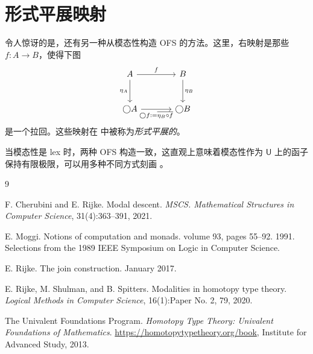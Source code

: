 \documentclass[UTF8]{ctexart}
\theoremstyle{definition}
\newcommand{\U}{\mathsf{U}}
\newcommand{\modal}{\bigcirc}
\begin{document}
\section{形式平展映射}

令人惊讶的是，还有另一种从模态性构造 OFS 的方法。这里，右映射是那些 $f : A \to B$，使得下图
\[
\begin{tikzcd}[row sep=large, column sep=large]
A \arrow[r, "f"] \arrow[d, "\eta_A"'] & B \arrow[d, "\eta_B"] \\
\modal A \arrow[r, "\modal f:=\overline{\eta_B\circ f}"'] & \modal B
\end{tikzcd}
\]
是一个拉回。这些映射在 \cite{CR21} 中被称为\emph{形式平展的}。

当模态性是 lex 时，两种 OFS 构造一致，这直观上意味着模态性作为 $\U$ 上的函子保持有限极限，可以用多种不同方式刻画 \cite[定理 3.1]{RSS20}。

\begin{thebibliography}{9}

F. Cherubini and E. Rijke.
Modal descent.
\textit{MSCS. Mathematical Structures in Computer Science}, 31(4):363--391, 2021.

E. Moggi.
Notions of computation and monads.
volume 93, pages 55--92. 1991.
Selections from the 1989 IEEE Symposium on Logic in Computer Science.

E. Rijke.
The join construction.
January 2017.

E. Rijke, M. Shulman, and B. Spitters.
Modalities in homotopy type theory.
\textit{Logical Methods in Computer Science}, 16(1):Paper No. 2, 79, 2020.

The Univalent Foundations Program.
\textit{Homotopy Type Theory: Univalent Foundations of Mathematics}.
\url{https://homotopytypetheory.org/book},
Institute for Advanced Study, 2013.

\end{thebibliography}
\end{document}
